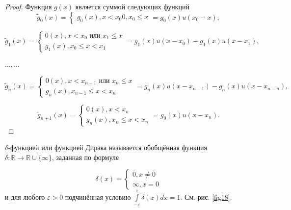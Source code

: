 \begin{proof}
	Функция $g(x)$ является суммой следующих функций
	\begin{equation*}
		\widetilde{g}_0(x)=
		\begin{cases}
			g_0(x), x<x_0
			0,x_0\leqslant x
		\end{cases}
		=g_0(x)u(x_0-x),
	\end{equation*}

	\begin{equation*}
		\widetilde{g}_1(x)=
		\begin{cases}
			0(x), x<x_0 \text{ или } x_1\leqslant x \\
			g_1(x),x_0\leqslant x<x_1
		\end{cases}
		=g_1(x)u(x-x_0)-g_1(x)u(x-x_1),
	\end{equation*}

	$\ldots,\ldots$

	\begin{equation*}
		\widetilde{g}_n(x)=
		\begin{cases}
			0(x), x<x_{n-1} \text{ или } x_n\leqslant x \\
			g_n(x),x_{n-1}\leqslant x<x_n
		\end{cases}
		=g_n(x)u(x-x_{n-1})-g_n(x)u(x-x_{n-n}),
	\end{equation*}

		\begin{equation*}
		\widetilde{g}_{n+1}(x)=
		\begin{cases}
			0(x), x<x_{n}\\
			g_n(x),x_{n}\leqslant x<x_n
		\end{cases}
		=g_0(x)u(x-x_{n}).
	\end{equation*}

\end{proof}

\begin{definition}
	$\delta$-функцией или функцией Дирака называется обобщённая функция
	$\delta : \mathbb{R}\rightarrow\mathbb{R}\cup\{\infty\}$, заданная по формуле

	\begin{equation*}
		\delta(x)=
		\begin{cases}
			0, x \neq 0 \\
			\infty, x=0			
		\end{cases}
	\end{equation*}
	и для любого $\varepsilon > 0$ подчинённая условию $\int\limits^\varepsilon_{-\varepsilon}\delta(x)dx=1$. См. рис. \ref{fig18}.
\end{definition}

